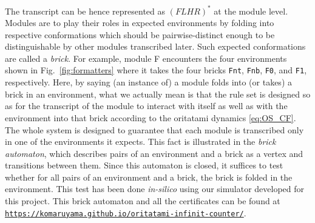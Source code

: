 \documentclass[twocolumn]{svjour3}
\begin{document}
\noindent
The transcript can be hence represented as $(FLHR)^*$ at the module level. Modules are to play their roles in expected environments by folding into respective conformations which should be pairwise-distinct enough to be distinguishable by other modules transcribed later.
Such expected conformations are called a \textit{brick}.
For example, module F encounters the four environments shown in Fig.~\ref{fig:formatters} where it takes the four bricks \texttt{Fnt}, \texttt{Fnb}, \texttt{F0}, and \texttt{F1}, respectively.
Here, by saying (an instance of) a module folds into (or takes) a brick in an environment, what we actually mean is that the rule set is designed so as for the transcript of the module to interact with itself as well as with the environment into that brick according to the oritatami dynamics  \eqref{eq:OS_CF}.
The whole system is designed to guarantee that each module is transcribed only in one of the environments it expects.
This fact is illustrated in the \textit{brick automaton}, which describes pairs of an environment and a brick as a vertex and transitions between them.
Since this automaton is closed, it suffices to test whether for all pairs of an environment and a brick, the brick is folded in the environment.
This test has been done \textit{in-silico} using our simulator developed for this project.
This brick automaton and all the certificates can be found at \href{https://komaruyama.github.io/oritatami-infinit-counter/}{\footnotesize \texttt{https://komaruyama.github.io/oritatami-infinit-counter/}}.
\end{document}
